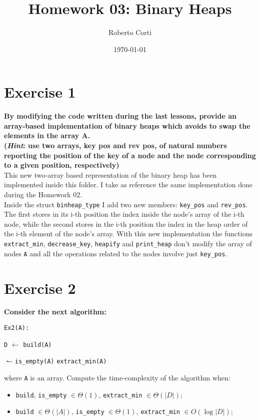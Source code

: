 \documentclass{article}
\title{Homework 03: Binary Heaps}
\date{\today}
\author{Roberto Corti}
\begin{document}
	\maketitle
	\section*{Exercise 1}
	\textbf{By modifying the code written during the last lessons, provide an array-based implementation of binary heaps which avoids to swap the elements in the array A. \\
	(\textit{Hint}: use two arrays, key pos and rev pos, of natural numbers reporting the position of the key of a node and the node corresponding to a given position, respectively)} \\
	
	\noindent This new two-array based representation of the binary heap has been implemented inside this folder. I take as reference the same implementation done during the Homework 02. \\
	Inside the struct \texttt{binheap\_type} I add two new members: \texttt{key\_pos} and \texttt{rev\_pos}. The first stores in its i-th position the index inside the node's array of the i-th node, while the second stores in the i-th position the index in the heap order of the i-th element of the node's array. With this new implementation the functions \texttt{extract\_min}, \texttt{decrease\_key}, \texttt{heapify} and \texttt{print\_heap} don't modify the array of nodes \texttt{A} and all the operations related to the nodes involve just \texttt{key\_pos}.
	\section*{Exercise 2}
	\textbf{Consider the next algorithm:}
	
	\begin{algorithm}
	\texttt{Ex2(A):} \label{ex2}
	\begin{algorithmic}
		\State \texttt{D} $\gets$ \texttt{build(A)}
		
		\While $\leftharpoonup$\texttt{is\_empty(A)}
			\State \texttt{extract\_min(A)}
		\EndWhile
	
	\end{algorithmic}
\end{algorithm}

	where \texttt{A} is an array. Compute the time-complexity of the algorithm when:
	
	\begin{itemize}
		\item \texttt{build}, \texttt{is\_empty} $\in \Theta(1)$, \texttt{extract\_min} $\in \Theta(|D|)$;
		\item \texttt{build} $\in \Theta(|A|)$, \texttt{is\_empty} $\in \Theta(1)$, \texttt{extract\_min} $\in O(\log|D|)$;
	\end{itemize}
\end{document}
